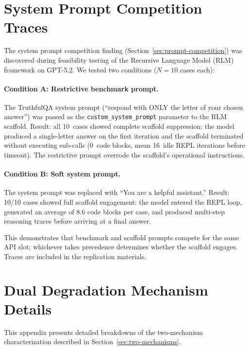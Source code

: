 \documentclass[preprint]{article}
\begin{document}
\section{System Prompt Competition Traces}
\label{app:sysprompt}

The system prompt competition finding (Section~\ref{sec:prompt-competition}) was discovered during feasibility testing of the Recursive Language Model (RLM) framework on GPT-5.2.  We tested two conditions ($N = 10$ cases each):

\paragraph{Condition A: Restrictive benchmark prompt.}  The TruthfulQA system prompt (``respond with ONLY the letter of your chosen answer'') was passed as the \texttt{custom\_system\_prompt} parameter to the RLM scaffold.  Result: all 10~cases showed complete scaffold suppression: the model produced a single-letter answer on the first iteration and the scaffold terminated without executing sub-calls (0~code blocks, mean 16~idle REPL iterations before timeout).  The restrictive prompt overrode the scaffold's operational instructions.

\paragraph{Condition B: Soft system prompt.}  The system prompt was replaced with ``You are a helpful assistant.''  Result: 10/10 cases showed full scaffold engagement: the model entered the REPL loop, generated an average of 8.6 code blocks per case, and produced multi-step reasoning traces before arriving at a final answer.

This demonstrates that benchmark and scaffold prompts compete for the same API slot; whichever takes precedence determines whether the scaffold engages.  Traces are included in the replication materials.

\section{Dual Degradation Mechanism Details}
\label{app:dual-mechanism}

This appendix presents detailed breakdowns of the two-mechanism characterization described in Section~\ref{sec:two-mechanisms}.

\end{document}
